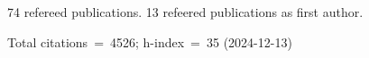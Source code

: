 74 refereed publications. 13 refeered publications as first author.

Total citations~=~4526; h-index~=~35 (2024-12-13)